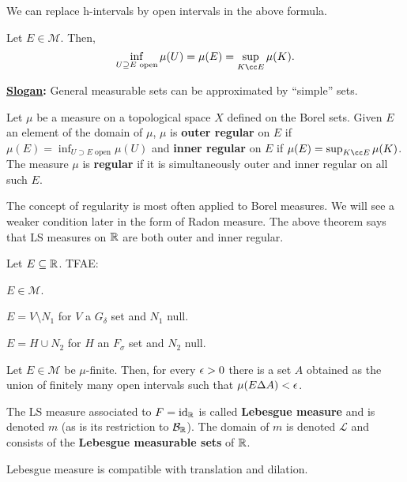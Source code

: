 \documentclass[11pt]{article}
\newcommand{\B}{\mathcal{B}}
\renewcommand{\L}{\mathcal{L}}
\newcommand{\M}{\mathcal{M}}
\begin{document}
\begin{lemma}
We can replace h-intervals by open intervals in the above formula.
\end{lemma}

\begin{theorem}
Let $E\in\M$. Then,
$$\inf_{U\supset E\textrm{ open}}\mu(U)=\mu(E)=\sup_{K\cc E}\mu(K).$$
\end{theorem}

\textbf{\underline{Slogan}:} General measurable sets can be approximated by ``simple'' sets.

\begin{definition}
Let $\mu$ be a measure on a topological space $X$ defined on the Borel sets. Given $E$ an element of the domain of $\mu$, $\mu$ is \textbf{outer regular} on $E$ if $\mu(E)=\inf_{U\supset E\textrm{ open}}\mu(U)$ and \textbf{inner regular} on $E$ if $\mu(E)=\sup_{K\cc E}\mu(K)$. The measure $\mu$ is \textbf{regular} if it is simultaneously outer and inner regular on all such $E$.
\end{definition}

The concept of regularity is most often applied to Borel measures. We will see a weaker condition later in the form of Radon measure. The above theorem says that LS measures on $\mathbb{R}$ are both outer and inner regular.

\begin{theorem}
Let $E\subseteq\mathbb{R}$. TFAE:
\begin{enum}{\roman}
\item $E\in\M$.
\item $E=V\setminus N_1$ for $V$ a $G_{\delta}$ set and $N_1$ null.
\item $E=H\cup N_2$ for $H$ an $F_{\sigma}$ set and $N_2$ null.
\end{enum}
\end{theorem}

\begin{proposition}
Let $E\in\M$ be $\mu$-finite. Then, for every $\epsilon>0$ there is a set $A$ obtained as the union of finitely many open intervals such that $\mu(E\Delta A)<\epsilon$.
\end{proposition}

The LS measure associated to $F=\operatorname{id}_{\mathbb{R}}$ is called \textbf{Lebesgue measure} and is denoted $m$ (as is its restriction to $\B_{\R}$). The domain of $m$ is denoted $\L$ and consists of the \textbf{Lebesgue measurable sets} of $\mathbb{R}$.

\begin{theorem}
Lebesgue measure is compatible with translation and dilation.
\end{theorem}
\end{document}
